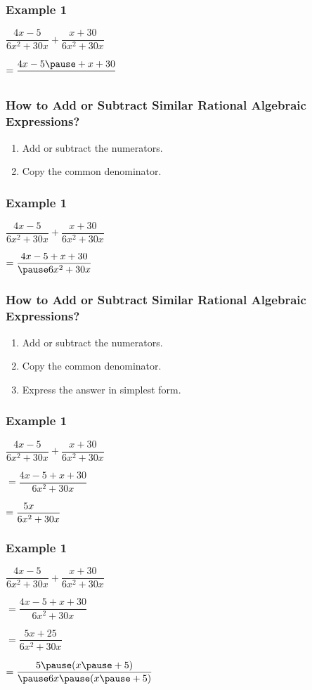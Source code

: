 \documentclass[14pt]{beamer}
\begin{document}
    \begin{frame}
    	\frametitle{Example 1}
    	$ \dfrac{4x - 5}{6x^2 + 30x} + \dfrac{x + 30}{6x^2 + 30x} $ 
    	
    	\pause \vspace{1em} $ = \dfrac{4x - 5 \pause + x + 30}{} $ 
    \end{frame}

    \begin{frame}
    	\frametitle{How to Add or Subtract Similar Rational Algebraic Expressions?}
    	\begin{enumerate}
    		\item Add or subtract the numerators.
    		\item Copy the common denominator.
    	\end{enumerate}
    \end{frame}

    \begin{frame}
    	\frametitle{Example 1}
    	$ \dfrac{4x - 5}{6x^2 + 30x} + \dfrac{x + 30}{6x^2 + 30x} $ 
    	
        \vspace{1em} $ = \dfrac{4x - 5 + x + 30}{\pause 6x^2 + 30x} $ 
    \end{frame}

    \begin{frame}
    	\frametitle{How to Add or Subtract Similar Rational Algebraic Expressions?}
    	\begin{enumerate}
    		\item Add or subtract the numerators.
    		\item Copy the common denominator.
    		\item Express the answer in simplest form.
    	\end{enumerate}
    \end{frame}

    \begin{frame}
    	\frametitle{Example 1}
    	$ \dfrac{4x - 5}{6x^2 + 30x} + \dfrac{x + 30}{6x^2 + 30x} $ 
    	
    	\vspace{1em} $ = \dfrac{4x - 5 + x + 30}{6x^2 + 30x} $ 
    	
    	\pause \vspace{1em} $ = \dfrac{5x \text{\hspace{2em}}}{6x^2 + 30x} $ 
    \end{frame}

    \begin{frame}
    	\frametitle{Example 1}
    	$ \dfrac{4x - 5}{6x^2 + 30x} + \dfrac{x + 30}{6x^2 + 30x} $ 
    	
    	\vspace{1em} $ = \dfrac{4x - 5 + x + 30}{6x^2 + 30x} $ 
    	
    	\vspace{1em} $ = \dfrac{5x + 25 }{6x^2 + 30x} $ 
    	
    	\pause \vspace{1em} $ = \dfrac{ 5 \pause (x \pause + 5) }{\pause 6x \pause (x \pause + 5)} $ 
    \end{frame}
\end{document}

